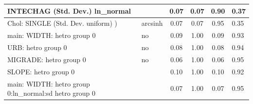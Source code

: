 \begin{table}
\begin{center}
\begin{tabular}{|l|l|c|c|c|l|}
			\hline
			INTECHAG (Std. Dev.) ln_normal &  & 0.07 & 0.07 & 0.90 & 0.37 \\
			\hline
			 Chol: SINGLE (Std. Dev. uniform) ) & arcsinh & 0.07 & 0.07 & 0.95 & 0.35 \\
			\hline
			main: WIDTH: hetro group 0 & no & 0.09 & 1.00 & 0.09 & 0.93 \\
			\hline
			URB: hetro group 0 & no & 0.08 & 1.00 & 0.08 & 0.94 \\
			\hline
			MIGRADE: hetro group 0 & no & 0.06 & 1.00 & 0.06 & 0.95 \\
			\hline
			SLOPE: hetro group 0 &  & 0.10 & 1.00 & 0.10 & 0.92 \\
			\hline
			main: WIDTH: hetro group 0:ln_normal:sd  hetro group 0 &  & 0.07 & 1.00 & 0.07 & 0.95 \\
			\hline
		\end{tabular}
	\end{center}
\end{table}
